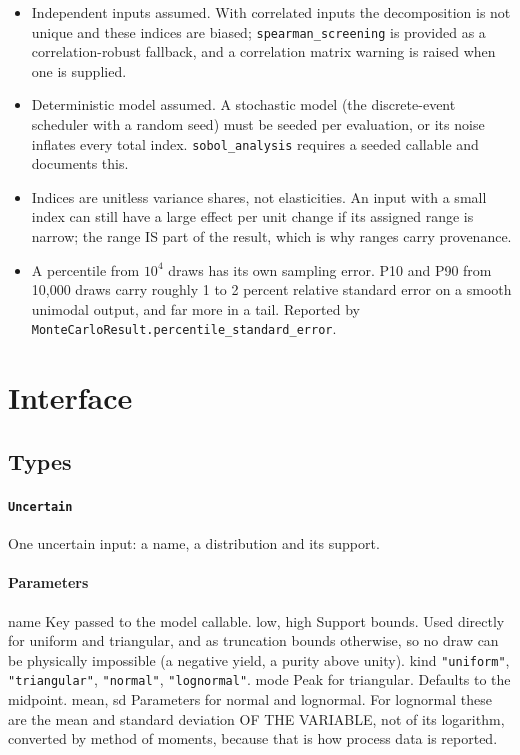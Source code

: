 \documentclass[10pt,a4paper,twoside]{report}
\begin{document}
\begin{itemize}
\item Independent inputs assumed. With correlated inputs the decomposition is not unique and these indices are biased; \texttt{spearman\_screening} is provided as a correlation-robust fallback, and a correlation matrix warning is raised when one is supplied.
\item Deterministic model assumed. A stochastic model (the discrete-event scheduler with a random seed) must be seeded per evaluation, or its noise inflates every total index. \texttt{sobol\_analysis} requires a seeded callable and documents this.
\item Indices are unitless variance shares, not elasticities. An input with a small index can still have a large effect per unit change if its assigned range is narrow; the range IS part of the result, which is why ranges carry provenance.
\item A percentile from $10^4$ draws has its own sampling error. P10 and P90 from 10,000 draws carry roughly 1 to 2 percent relative standard error on a smooth unimodal output, and far more in a tail. Reported by \texttt{MonteCarloResult.percentile\_standard\_error}.
\end{itemize}

\section{Interface}

\subsection*{Types}

\paragraph{\texttt{Uncertain}}

One uncertain input: a name, a distribution and its support.

\paragraph*{Parameters}

name Key passed to the model callable. low, high Support bounds. Used directly for uniform and triangular, and as truncation bounds otherwise, so no draw can be physically impossible (a negative yield, a purity above unity). kind \texttt{"uniform"}, \texttt{"triangular"}, \texttt{"normal"}, \texttt{"lognormal"}. mode Peak for triangular. Defaults to the midpoint. mean, sd Parameters for normal and lognormal. For lognormal these are the mean and standard deviation OF THE VARIABLE, not of its logarithm, converted by method of moments, because that is how process data is reported.
\end{document}
